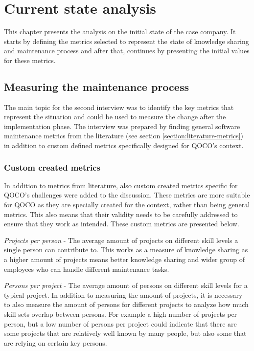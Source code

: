 \chapter{Current state analysis}
\label{chapter:current-state} 

This chapter presents the analysis on the initial state of the case company. It starts by defining the metrics selected to represent the state of knowledge sharing and
maintenance process and after that, continues by presenting the initial values for these metrics.

\section{Measuring the maintenance process}
\label{section:measuring}

The main topic for the second interview was to identify the key metrics that represent the situation and could be used to measure the change after the implementation phase.
The interview was prepared by finding general software maintenance metrics from the literature (see section \ref{section:literature-metrics}) in addition to custom defined metrics specifically designed for QOCO's
context.

\subsection*{Custom created metrics}

In addition to metrics from literature, also custom created metrics specific for QOCO's challenges were added to the discussion.
These metrics are more suitable for
QOCO as they are specially created for the context, rather than being general metrics. This also means that their validity needs to be carefully addressed to ensure that they work as intended. These custom metrics are presented below.

\emph{Projects per person} - The average amount of projects on different skill levels a single person can contribute to. This works as a measure of knowledge sharing as a higher amount
of projects means better knowledge sharing and wider group of employees who can handle different maintenance tasks.

\emph{Persons per project} - The average amount of persons on different skill levels for a typical project. In addition to measuring the amount of projects, it is necessary to also measure
the amount of persons for different projects to analyze how much skill sets overlap between persons. For example a high number of projects per person, but a low number of persons per project
could indicate that there are some projects that are relatively well known by many people, but also some that are relying on certain key persons.

